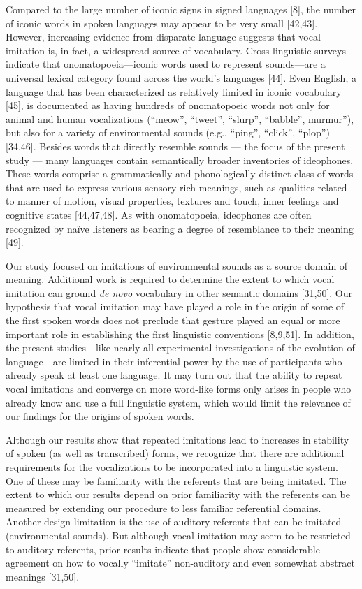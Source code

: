 \documentclass[english,floatsintext,man]{apa6}
\theoremstyle{definition}
\theoremstyle{definition}
\theoremstyle{definition}
\theoremstyle{remark}
\begin{document}
Compared to the large number of iconic signs in signed languages
{[}8{]}, the number of iconic words in spoken languages may appear to be
very small {[}42,43{]}. However, increasing evidence from disparate
language suggests that vocal imitation is, in fact, a widespread source
of vocabulary. Cross-linguistic surveys indicate that
onomatopoeia---iconic words used to represent sounds---are a universal
lexical category found across the world's languages {[}44{]}. Even
English, a language that has been characterized as relatively limited in
iconic vocabulary {[}45{]}, is documented as having hundreds of
onomatopoeic words not only for animal and human vocalizations
(\enquote{meow}, \enquote{tweet}, \enquote{slurp}, \enquote{babble},
murmur''), but also for a variety of environmental sounds (e.g.,
\enquote{ping}, \enquote{click}, \enquote{plop}) {[}34,46{]}. Besides
words that directly resemble sounds --- the focus of the present study
--- many languages contain semantically broader inventories of
ideophones. These words comprise a grammatically and phonologically
distinct class of words that are used to express various sensory-rich
meanings, such as qualities related to manner of motion, visual
properties, textures and touch, inner feelings and cognitive states
{[}44,47,48{]}. As with onomatopoeia, ideophones are often recognized by
naïve listeners as bearing a degree of resemblance to their meaning
{[}49{]}.

Our study focused on imitations of environmental sounds as a source
domain of meaning. Additional work is required to determine the extent
to which vocal imitation can ground \emph{de novo} vocabulary in other
semantic domains {[}31,50{]}. Our hypothesis that vocal imitation may
have played a role in the origin of some of the first spoken words does
not preclude that gesture played an equal or more important role in
establishing the first linguistic conventions {[}8,9,51{]}. In addition,
the present studies---like nearly all experimental investigations of the
evolution of language---are limited in their inferential power by the
use of participants who already speak at least one language. It may turn
out that the ability to repeat vocal imitations and converge on more
word-like forms only arises in people who already know and use a full
linguistic system, which would limit the relevance of our findings for
the origins of spoken words.

Although our results show that repeated imitations lead to increases in
stability of spoken (as well as transcribed) forms, we recognize that
there are additional requirements for the vocalizations to be
incorporated into a linguistic system. One of these may be familiarity
with the referents that are being imitated. The extent to which our
results depend on prior familiarity with the referents can be measured
by extending our procedure to less familiar referential domains. Another
design limitation is the use of auditory referents that can be imitated
(environmental sounds). But although vocal imitation may seem to be
restricted to auditory referents, prior results indicate that people
show considerable agreement on how to vocally \enquote{imitate}
non-auditory and even somewhat abstract meanings {[}31,50{]}.
\end{document}
